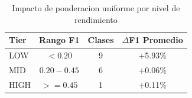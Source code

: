 
\begin{table}[h]
\centering
\caption{Impacto de ponderacion uniforme por nivel de rendimiento}
\label{tab:tier_impact}
\begin{tabular}{lccc}
\hline
Tier & Rango F1 & Clases & $\Delta$F1 Promedio \\
\hline
LOW & $< 0.20$ & 9 & +5.93\% \\
MID & $0.20 - 0.45$ & 6 & +0.06\% \\
HIGH & $>= 0.45$ & 1 & +0.11\% \\

\hline
\end{tabular}
\end{table}
